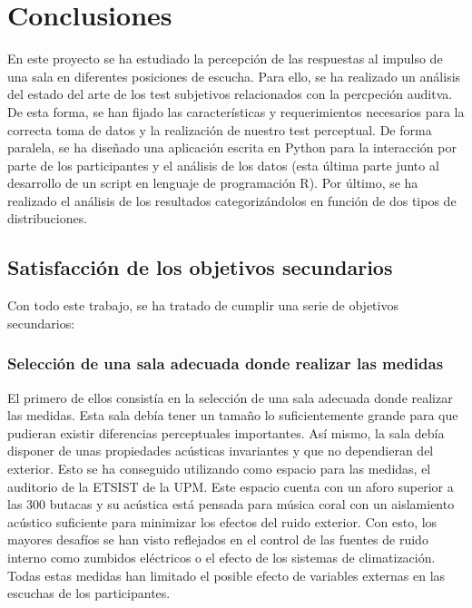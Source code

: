 \documentclass[11pt,a4paper]{book}
\begin{document}
\chapter{Conclusiones}
    En este proyecto se ha estudiado la percepción de las respuestas al impulso de una sala en diferentes posiciones de escucha. Para ello, se ha realizado un análisis del estado del arte de los test subjetivos relacionados con la percpeción auditva. De esta forma, se han fijado las características y requerimientos necesarios para la correcta toma de datos y la realización de nuestro test perceptual. De forma paralela, se ha diseñado una aplicación escrita en Python para la interacción por parte de los participantes y el análisis de los datos (esta última parte junto al desarrollo de un script en lenguaje de programación R). Por último, se ha realizado el análisis de los resultados categorizándolos en función de dos tipos de distribuciones.
    
    \section{Satisfacción de los objetivos secundarios}
    
        Con todo este trabajo, se ha tratado de cumplir una serie de objetivos secundarios:
        
        \subsection*{Selección de una sala adecuada donde realizar las medidas}    
            El primero de ellos consistía en la selección de una sala adecuada donde realizar las medidas. Esta sala debía tener un tamaño lo suficientemente grande para que pudieran existir diferencias perceptuales importantes. Así mismo, la sala debía disponer de unas propiedades acústicas invariantes y que no dependieran del exterior. Esto se ha conseguido utilizando como espacio para las medidas, el auditorio de la ETSIST de la UPM. Este espacio cuenta con un aforo superior a las 300 butacas y su acústica está pensada para música coral con un aislamiento acústico suficiente para minimizar los efectos del ruido exterior. Con esto, los mayores desafíos se han visto reflejados en el control de las fuentes de ruido interno como zumbidos eléctricos o el efecto de los sistemas de climatización. Todas estas medidas han limitado el posible efecto de variables externas en las escuchas de los participantes.
        
\end{document}
